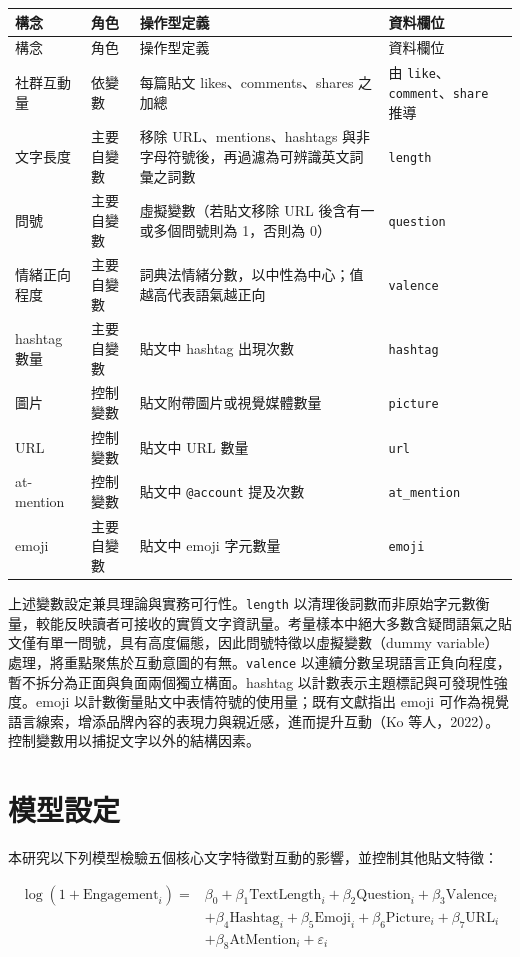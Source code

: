 \documentclass[12pt,a4paper,fontset=none]{ctexart}
\begin{document}
\small
\begin{longtable}{@{}L{0.18\textwidth} L{0.16\textwidth} L{0.40\textwidth} L{0.14\textwidth}@{}}
\toprule
構念 & 角色 & 操作型定義 & 資料欄位 \\
\midrule
\endfirsthead
\toprule
構念 & 角色 & 操作型定義 & 資料欄位 \\
\midrule
\endhead
社群互動量 & 依變數 & 每篇貼文 likes、comments、shares 之加總 & 由 \texttt{like}、\texttt{comment}、\texttt{share} 推導 \\
文字長度 & 主要自變數 & 移除 URL、mentions、hashtags 與非字母符號後，再過濾為可辨識英文詞彙之詞數 & \texttt{length} \\
問號 & 主要自變數 & 虛擬變數（若貼文移除 URL 後含有一或多個問號則為 1，否則為 0） & \texttt{question} \\
情緒正向程度 & 主要自變數 & 詞典法情緒分數，以中性為中心；值越高代表語氣越正向 & \texttt{valence} \\
hashtag 數量 & 主要自變數 & 貼文中 hashtag 出現次數 & \texttt{hashtag} \\
圖片 & 控制變數 & 貼文附帶圖片或視覺媒體數量 & \texttt{picture} \\
URL & 控制變數 & 貼文中 URL 數量 & \texttt{url} \\
at-mention & 控制變數 & 貼文中 \texttt{@account} 提及次數 & \texttt{at\_mention} \\
emoji & 主要自變數 & 貼文中 emoji 字元數量 & \texttt{emoji} \\
\bottomrule
\end{longtable}
\normalsize

上述變數設定兼具理論與實務可行性。\texttt{length} 以清理後詞數而非原始字元數衡量，較能反映讀者可接收的實質文字資訊量。考量樣本中絕大多數含疑問語氣之貼文僅有單一問號，具有高度偏態，因此問號特徵以虛擬變數（dummy variable）處理，將重點聚焦於互動意圖的有無。\texttt{valence} 以連續分數呈現語言正負向程度，暫不拆分為正面與負面兩個獨立構面。hashtag 以計數表示主題標記與可發現性強度。emoji 以計數衡量貼文中表情符號的使用量；既有文獻指出 emoji 可作為視覺語言線索，增添品牌內容的表現力與親近感，進而提升互動（Ko 等人，2022）。控制變數用以捕捉文字以外的結構因素。

\section{模型設定}
本研究以下列模型檢驗五個核心文字特徵對互動的影響，並控制其他貼文特徵：

\begin{equation}
\begin{aligned}
\log(1 + \text{Engagement}_i) = {}& \beta_0 + \beta_1\text{TextLength}_i + \beta_2\text{Question}_i + \beta_3\text{Valence}_i \\
& + \beta_4\text{Hashtag}_i + \beta_5\text{Emoji}_i + \beta_6\text{Picture}_i + \beta_7\text{URL}_i \\
& + \beta_8\text{AtMention}_i + \varepsilon_i
\end{aligned}
\end{equation}
\end{document}
